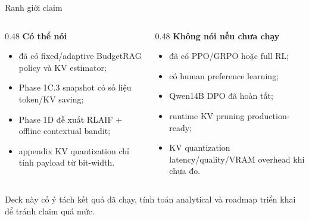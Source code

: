 \documentclass[aspectratio=169,10pt]{beamer}
\newcommand{\minihead}[1]{{\bfseries\color{AccentDark}#1}}
\newcommand{\takeaway}[1]{%
  \vspace{0.46em}
  \noindent\colorbox{Soft}{%
    \parbox{\dimexpr\linewidth-2\fboxsep}{\color{Ink}\strut #1\strut}%
  }%
}
\newenvironment{tightitemize}{\begin{itemize}\setlength{\itemsep}{0.22em}\setlength{\parskip}{0pt}}{\end{itemize}}
\begin{document}
\begin{frame}{Ranh giới claim}
  \small
  \begin{columns}[T,onlytextwidth]
    \begin{column}{0.48\textwidth}
      \minihead{Có thể nói}\\
      \begin{tightitemize}
        \item đã có fixed/adaptive BudgetRAG policy và KV estimator;
        \item Phase 1C.3 snapshot có số liệu token/KV saving;
        \item Phase 1D đề xuất RLAIF + offline contextual bandit;
        \item appendix KV quantization chỉ tính payload từ bit-width.
      \end{tightitemize}
    \end{column}
    \begin{column}{0.48\textwidth}
      \minihead{Không nói nếu chưa chạy}\\
      \begin{tightitemize}
        \item đã có PPO/GRPO hoặc full RL;
        \item có human preference learning;
        \item Qwen14B DPO đã hoàn tất;
        \item runtime KV pruning production-ready;
        \item KV quantization latency/quality/VRAM overhead khi chưa đo.
      \end{tightitemize}
    \end{column}
  \end{columns}
  \takeaway{\small Deck này cố ý tách kết quả đã chạy, tính toán analytical và roadmap triển khai để tránh claim quá mức.}
\end{frame}
\end{document}
